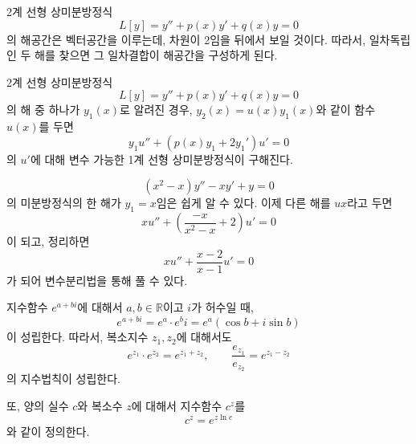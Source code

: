 \documentclass[../engineering_mathematics_lecture_note.tex]{subfiles}
\begin{document}
2계 선형 상미분방정식
\begin{equation*}
    L[y] = y'' + p(x) y' + q(x) y = 0
\end{equation*}
의 해공간은 벡터공간을 이루는데, 차원이 2임을 뒤에서 보일 것이다.
따라서, 일차독립인 두 해를 찾으면 그 일차결합이 해공간을 구성하게 된다.

\begin{example} \label{def:reduction}
    2계 선형 상미분방정식
    \begin{equation*}
        L[y] = y'' + p(x) y' + q(x) y = 0
    \end{equation*}
    의 해 중 하나가 $y_1(x)$로 알려진 경우, $y_2(x) = u(x)y_1(x)$와 같이 함수 $u(x)$를 두면
    \begin{equation*}
        y_1 u'' + \left( p(x) y_1 + 2y_1' \right) u' = 0
    \end{equation*}
    의 $u'$에 대해 변수 가능한 1계 선형 상미분방정식이 구해진다.
\end{example}

\begin{example}
    \begin{equation*}
        (x^2 - x) y'' - xy' + y = 0
    \end{equation*}
    의 미분방정식의 한 해가 $y_1 = x$임은 쉽게 알 수 있다.
    이제 다른 해를 $ux$라고 두면
    \begin{equation*}
        xu'' + \left( \frac{-x}{x^2 - x} + 2 \right) u' = 0
    \end{equation*}
    이 되고, 정리하면
    \begin{equation*}
        xu'' + \frac{x - 2}{x - 1} u' = 0
    \end{equation*}
    가 되어 변수분리법을 통해 풀 수 있다.
\end{example}

\begin{remark}
    지수함수 $e^{a + bi}$에 대해서 $a, b \in \mathbb R$이고 $i$가 허수일 때,
    \begin{equation*}
        e^{a + bi} = e^a \cdot e^bi = e^a (\cos b + i \sin b)
    \end{equation*}
    이 성립한다.
    따라서, 복소지수 $z_1, z_2$에 대해서도
    \begin{equation*}
        e^{z_1} \cdot e^{z_2} = e^{z_1 + z_2}, \qquad \frac{e_{z_1}}{e_{z_2}} = e^{z_1 - z_2}
    \end{equation*}
    의 지수법칙이 성립한다.

    또, 양의 실수 $c$와 복소수 $z$에 대해서 지수함수 $c^z$를
    \begin{equation*}
        c^z = e^{z \ln c}
    \end{equation*}
    와 같이 정의한다.
\end{remark}
\end{document}

